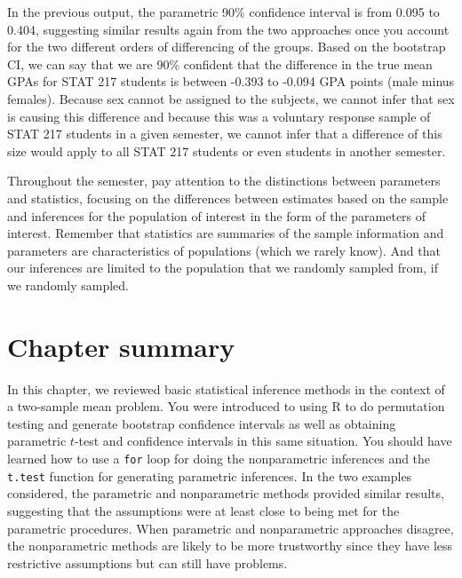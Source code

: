\documentclass[]{book}
\begin{document}
In the previous output, the parametric 90\% confidence interval is from
0.095 to 0.404, suggesting similar results again from the two approaches
once you account for the two different orders of differencing of the
groups. Based on the bootstrap CI, we can say that we are 90\% confident
that the difference in the true mean GPAs for STAT 217 students is
between -0.393 to -0.094 GPA points (male minus females). Because sex
cannot be assigned to the subjects, we cannot infer that sex is causing
this difference and because this was a voluntary response sample of STAT
217 students in a given semester, we cannot infer that a difference of
this size would apply to all STAT 217 students or even students in
another semester.

Throughout the semester, pay attention to the distinctions between
parameters and statistics, focusing on the differences between estimates
based on the sample and inferences for the population of interest in the
form of the parameters of interest. Remember that statistics are
summaries of the sample information and parameters are characteristics
of populations (which we rarely know). And that our inferences are
limited to the population that we randomly sampled from, if we randomly
sampled.

\section{Chapter summary}\label{section2-10}

In this chapter, we reviewed basic statistical inference methods in the
context of a two-sample mean problem. You were introduced to using R to
do permutation testing and generate bootstrap confidence intervals as
well as obtaining parametric \(t\)-test and confidence intervals in this
same situation. You should have learned how to use a \texttt{for} loop
for doing the nonparametric inferences and the \texttt{t.test} function
for generating parametric inferences. In the two examples considered,
the parametric and nonparametric methods provided similar results,
suggesting that the assumptions were at least close to being met for the
parametric procedures. When parametric and nonparametric approaches
disagree, the nonparametric methods are likely to be more trustworthy
since they have less restrictive assumptions but can still have
problems.
\end{document}
